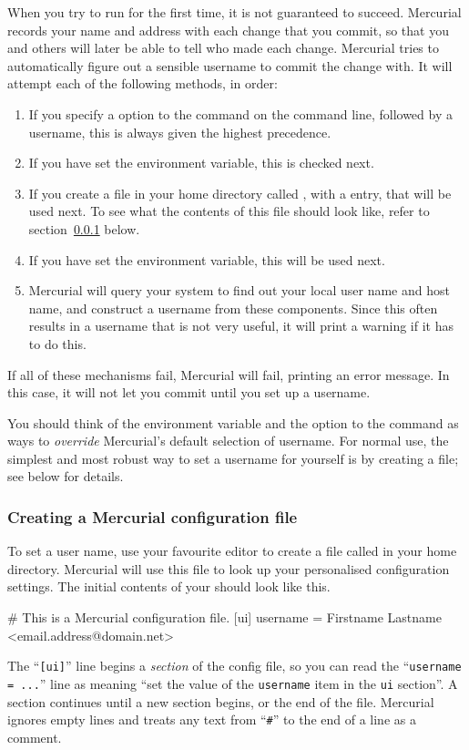 When you try to run  for the first time, it is not
guaranteed to succeed.  Mercurial records your name and address with
each change that you commit, so that you and others will later be able
to tell who made each change.  Mercurial tries to automatically figure
out a sensible username to commit the change with.  It will attempt
each of the following methods, in order:
\begin{enumerate}
\item If you specify a  option to the 
  command on the command line, followed by a username, this is always
  given the highest precedence.
\item If you have set the  environment variable, this is
  checked next.
\item If you create a file in your home directory called
  , with a  entry, that will be
  used next.  To see what the contents of this file should look like,
  refer to section~\ref{sec:tour-basic:username} below.
\item If you have set the  environment variable, this
  will be used next.
\item Mercurial will query your system to find out your local user
  name and host name, and construct a username from these components.
  Since this often results in a username that is not very useful, it
  will print a warning if it has to do this.
\end{enumerate}
If all of these mechanisms fail, Mercurial will fail, printing an
error message.  In this case, it will not let you commit until you set
up a username.

You should think of the  environment variable and the
 option to the  command as ways to
\emph{override} Mercurial's default selection of username.  For normal
use, the simplest and most robust way to set a username for yourself
is by creating a  file; see below for details.

\subsubsection{Creating a Mercurial configuration file}
\label{sec:tour-basic:username}

To set a user name, use your favourite editor to create a file called
 in your home directory.  Mercurial will use this
file to look up your personalised configuration settings.  The initial
contents of your  should look like this.
\begin{codesample2}
  # This is a Mercurial configuration file.
  [ui]
  username = Firstname Lastname <email.address@domain.net>
\end{codesample2}
The ``\texttt{[ui]}'' line begins a \emph{section} of the config file,
so you can read the ``\texttt{username = ...}'' line as meaning ``set
the value of the \texttt{username} item in the \texttt{ui} section''.
A section continues until a new section begins, or the end of the
file.  Mercurial ignores empty lines and treats any text from
``\texttt{\#}'' to the end of a line as a comment.

